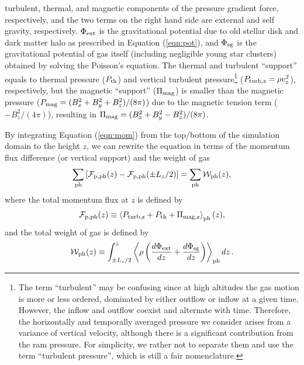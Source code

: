 \documentclass[twocolumn]{aastex62}
\newcommand\deriv[2]{\frac{d {#1}}{d {#2}}}
\newcommand\rbrackets[1]{\left({#1}\right)}
\newcommand\sbrackets[1]{\left[{#1}\right]}
\newcommand\abrackets[1]{\left\langle{#1}\right\rangle}
\begin{document}
turbulent, thermal, and magnetic components of the pressure gradient force, respectively, and the two terms on the right hand side are external and self gravity, respectively. $\Phi_{\rm ext}$ is the gravitational potential due to old stellar disk and dark matter halo as prescribed in Equation (\ref{eqn:pot}), and $\Phi_{\rm sg}$ is the gravitational potential of gas itself (including negligible young star clusters) obtained by solving the Poisson's equation.  The thermal and turbulent ``support'' equals to thermal pressure ($P_{\rm th }$) and vertical turbulent pressure\footnote{The term ``turbulent'' may be confusing since at high altitudes the gas motion is more or less ordered, dominated by either outflow or inflow at a given time. However, the inflow and outflow coexist and alternate with time. Therefore, the horizontally and temporally averaged pressure we consider arises from a variance of vertical velocity, although there is a significant contribution from the ram pressure. For simplicity, we rather not to separate them and use the term ``turbulent pressure'', which is still a fair nomenclature.} ($P_{\rm turb,z}=\rho v_z^2$), respectively, but the magnetic ``support'' ($\Pi_{\rm mag}$) is smaller than the magnetic pressure ($P_{\rm mag} = (B_x^2+B_y^2+B_z^2)/(8\pi)$) due to the magnetic tension term ($-B_z^2/(4\pi)$), resulting in $\Pi_{\rm mag}= (B_x^2+B_y^2-B_z^2)/(8\pi)$.

By integrating Equation (\ref{eqn:mom}) from the top/bottom of the simulation domain to the height $z$, we can rewrite the equation in terms of the momentum flux difference (or vertical support) and the weight of gas
\begin{equation}\label{eqn:mom2}
\sum_{\rm ph} \sbrackets{ \mathcal{F}_{\rm p, ph} (z)- \mathcal{F}_{\rm p, ph} (\pm L_z/2)}
= \sum_{\rm ph} \mathcal{W}_{\rm ph}(z),
\end{equation}
where the total momentum flux at $z$ is defined by
\begin{equation}\label{eqn:Fp}
\mathcal{F}_{\rm p, ph}(z) \equiv \abrackets{P_{\rm turb,z} + P_{\rm th} + \Pi_{\rm mag,z}}_{\rm ph}(z),
\end{equation}
and the total weight of gas is defined by
\begin{equation}\label{eqn:weight}
\mathcal{W}_{\rm ph}(z) \equiv \int_{\pm L_z/2}^z \abrackets{\rho\rbrackets{\deriv{\Phi_{\rm ext}}{z} +\deriv{\Phi_{\rm sg}}{z}}}_{\rm ph} dz \,.
\end{equation}
\end{document}
